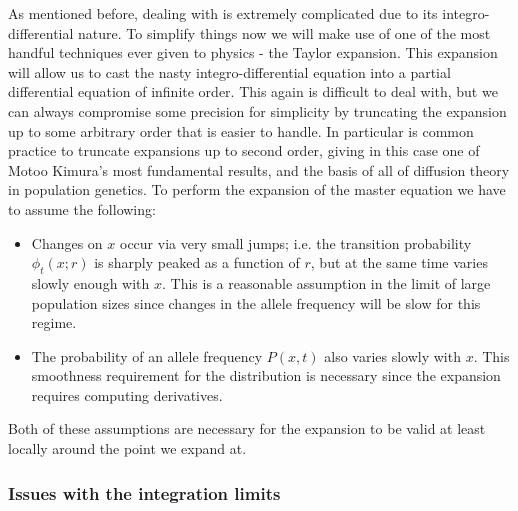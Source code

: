 As mentioned before, dealing with  is extremely
complicated due to its integro-differential nature. To simplify things now we
will make use of one of the most handful techniques ever given to physics - the
Taylor expansion. This expansion will allow us to cast the nasty
integro-differential equation into a partial differential equation of infinite
order. This again is difficult to deal with, but we can always compromise some
precision for simplicity by truncating the expansion up to some arbitrary order
that is easier to handle. In particular is common practice to truncate
expansions up to second order, giving in this case one of Motoo Kimura's most
fundamental results, and the basis of all of diffusion theory in population
genetics. To perform the expansion of the master equation we have to assume the
following:
\begin{itemize}
  \item Changes on $x$ occur via very small jumps; i.e. the transition
  probability $\phi_t(x; r)$ is sharply peaked as a function of $r$, but at the
  same time varies slowly enough with $x$. This is a reasonable assumption in
  the limit of large population sizes since changes in the allele frequency
  will be slow for this regime.
  \item The probability of an allele frequency $P(x, t)$ also varies slowly
  with $x$. This smoothness requirement for the distribution is necessary since
  the expansion requires computing derivatives.
\end{itemize}
Both of these assumptions are necessary for the expansion to be valid at least
locally around the point we expand at.

\subsubsection{Issues with the integration limits}

